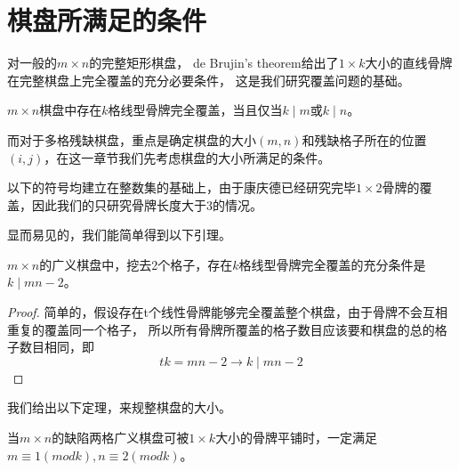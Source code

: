\chapter{棋盘所满足的条件}

对一般的$m \times n$的完整矩形棋盘， de Brujin's theorem\cite{fengBasicTheorem}给出了$1 \times k$大小的直线骨牌在完整棋盘上完全覆盖的充分必要条件，
这是我们研究覆盖问题的基础。

\begin{lemma}
    \label{basic-lemma-1}
    $m \times n$棋盘中存在$k$格线型骨牌完全覆盖，当且仅当$k \mid m$或$k \mid n$。
\end{lemma}

而对于多格残缺棋盘，重点是确定棋盘的大小$(m, n)$和残缺格子所在的位置$(i, j)$，在这一章节我们先考虑棋盘的大小所满足的条件。

以下的符号均建立在整数集的基础上，由于康庆德已经研究完毕$1 \times 2$骨牌的覆盖\cite{ZRZZ199205013}，因此我们的只研究骨牌长度大于3的情况。

显而易见的，我们能简单得到以下引理。
\begin{lemma}
    \label{basic-lemma-2}
    $m \times n$的广义棋盘中，挖去2个格子，存在$k$格线型骨牌完全覆盖的充分条件是$k \mid mn - 2$。
\end{lemma}
\begin{proof}
    简单的，假设存在t个线性骨牌能够完全覆盖整个棋盘，由于骨牌不会互相重复的覆盖同一个格子，
    所以所有骨牌所覆盖的格子数目应该要和棋盘的总的格子数目相同，即
    \begin{equation}
        tk = mn - 2 \rightarrow k \mid mn - 2
    \end{equation}
\end{proof}
我们给出以下定理，来规整棋盘的大小。
\begin{theorem}
    \label{basic-theorem-1}
    当$m \times n$的缺陷两格广义棋盘可被$1 \times k$大小的骨牌平铺时，一定满足$m \equiv 1 (mod k), n \equiv 2 (mod k)$。
\end{theorem}

